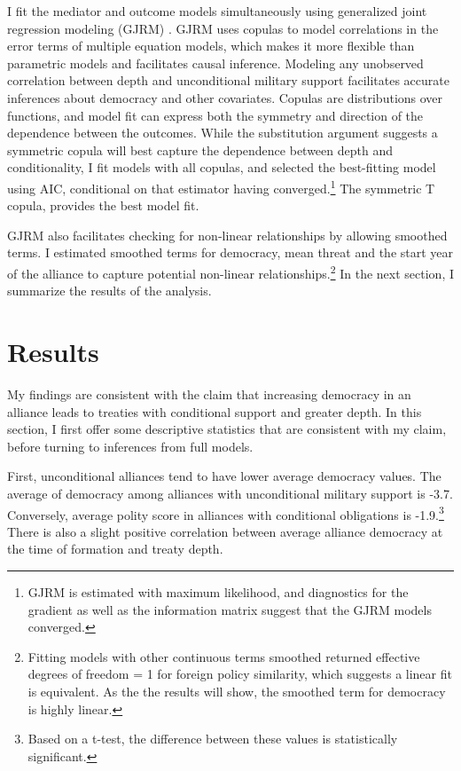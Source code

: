 \documentclass[12pt]{article}
\begin{document}
I fit the mediator and outcome models simultaneously using generalized joint regression modeling (GJRM) \citep{Braumoelleretal2018}.
GJRM uses copulas to model correlations in the error terms of multiple equation models, which makes it more flexible than parametric models and facilitates causal inference. 
Modeling any unobserved correlation between depth and unconditional military support facilitates accurate inferences about democracy and other covariates. 
Copulas are distributions over functions, and model fit can express both the symmetry and direction of the dependence between the outcomes. 
While the substitution argument suggests a symmetric copula will best capture the dependence between depth and conditionality, I fit models with all copulas, and selected the best-fitting model using AIC, conditional on that estimator having converged.\footnote{GJRM is estimated with maximum likelihood, and diagnostics for the gradient as well as the information matrix suggest that the GJRM models converged.} 
The symmetric T copula, provides the best model fit. 


GJRM also facilitates checking for non-linear relationships by allowing smoothed terms. 
I estimated smoothed terms for democracy, mean threat and the start year of the alliance to capture potential non-linear relationships.\footnote{Fitting models with other continuous terms smoothed returned effective degrees of freedom = 1 for foreign policy similarity, which suggests a linear fit is equivalent. As the the results will show, the smoothed term for democracy is highly linear.}  
In the next section, I summarize the results of the analysis. 



\section{Results}


My findings are consistent with the claim that increasing democracy in an alliance leads to treaties with conditional support and greater depth. 
In this section, I first offer some descriptive statistics that are consistent with my claim, before turning to inferences from full models. 


First, unconditional alliances tend to have lower average democracy values. 
The average of democracy among alliances with unconditional military support is -3.7. 
Conversely, average polity score in alliances with conditional obligations is -1.9.\footnote{Based on a t-test, the difference between these values is statistically significant.} 
There is also a slight positive correlation between average alliance democracy at the time of formation and treaty depth. 
\end{document}
